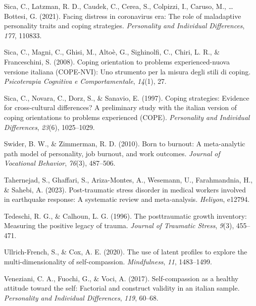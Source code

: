 \documentclass[
  man]{apa7}
\newlength{\cslhangindent}
\newlength{\cslentryspacingunit} %
\newenvironment{CSLReferences}[2] %
 {%
  \setlength{\parindent}{0pt}
  \ifodd #1
  \let\oldpar\par
  \def\par{\hangindent=\cslhangindent\oldpar}
  \fi
  \setlength{\parskip}{#2\cslentryspacingunit}
 }%
 {}
\begin{document}
\begin{CSLReferences}{1}{0}
\leavevmode{}%
Sica, C., Latzman, R. D., Caudek, C., Cerea, S., Colpizzi, I., Caruso, M., \ldots{} Bottesi, G. (2021). Facing distress in coronavirus era: The role of maladaptive personality traits and coping strategies. \emph{Personality and Individual Differences}, \emph{177}, 110833.

\leavevmode{}%
Sica, C., Magni, C., Ghisi, M., Altoè, G., Sighinolfi, C., Chiri, L. R., \& Franceschini, S. (2008). Coping orientation to problems experienced-nuova versione italiana (COPE-NVI): Uno strumento per la misura degli stili di coping. \emph{Psicoterapia Cognitiva e Comportamentale}, \emph{14}(1), 27.

\leavevmode{}%
Sica, C., Novara, C., Dorz, S., \& Sanavio, E. (1997). Coping strategies: Evidence for cross-cultural differences? A preliminary study with the italian version of coping orientations to problems experienced (COPE). \emph{Personality and Individual Differences}, \emph{23}(6), 1025--1029.

\leavevmode{}%
Swider, B. W., \& Zimmerman, R. D. (2010). Born to burnout: A meta-analytic path model of personality, job burnout, and work outcomes. \emph{Journal of Vocational Behavior}, \emph{76}(3), 487--506.

\leavevmode{}%
Tahernejad, S., Ghaffari, S., Ariza-Montes, A., Wesemann, U., Farahmandnia, H., \& Sahebi, A. (2023). Post-traumatic stress disorder in medical workers involved in earthquake response: A systematic review and meta-analysis. \emph{Heliyon}, e12794.

\leavevmode{}%
Tedeschi, R. G., \& Calhoun, L. G. (1996). The posttraumatic growth inventory: Measuring the positive legacy of trauma. \emph{Journal of Traumatic Stress}, \emph{9}(3), 455--471.

\leavevmode{}%
Ullrich-French, S., \& Cox, A. E. (2020). The use of latent profiles to explore the multi-dimensionality of self-compassion. \emph{Mindfulness}, \emph{11}, 1483--1499.

\leavevmode{}%
Veneziani, C. A., Fuochi, G., \& Voci, A. (2017). Self-compassion as a healthy attitude toward the self: Factorial and construct validity in an italian sample. \emph{Personality and Individual Differences}, \emph{119}, 60--68.


\end{CSLReferences}
\end{document}
